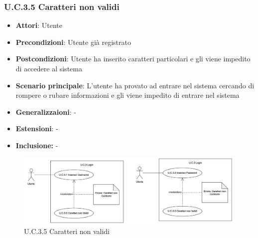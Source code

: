 \subsubsection{U.C.3.5 Caratteri non validi}
\begin{itemize}
    \item \textbf{Attori}: Utente
    \item \textbf{Precondizioni}: Utente già registrato
    \item \textbf{Postcondizioni}: Utente ha inserito caratteri particolari e gli viene impedito di accedere al sistema
    \item \textbf{Scenario principale}: L’utente ha provato ad entrare nel sistema cercando di rompere o rubare informazioni e gli viene impedito di entrare nel sistema
    \item \textbf{Generalizzaioni}: -
    \item \textbf{Estensioni}: -
    \item \textbf{Inclusione:} -
\end{itemize}
\begin{figure}[h!]
    \centering
    \includegraphics[width=\textwidth]{img/UC3-5.png}
    \caption{U.C.3.5 Caratteri non validi}
\end{figure}
